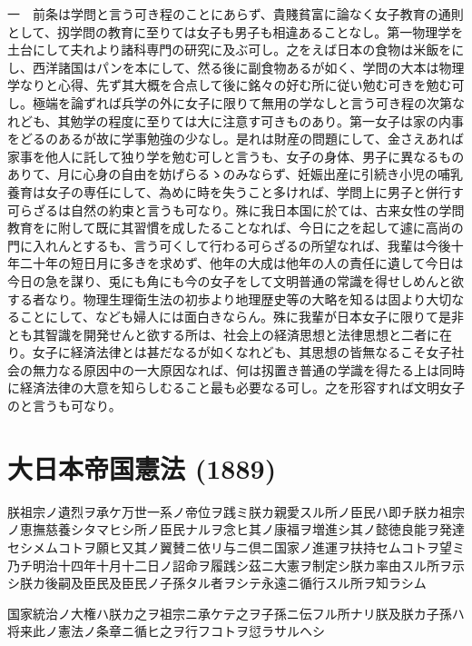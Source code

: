 \noindent{}一　前条は学問と言う可き程のことにあらず、貴賤貧富に論なく女子教育の通則として、扨学問の教育に至りては女子も男子も相違あることなし。第一物理学を土台にして夫れより諸科専門の研究に及ぶ可し。之をえば日本の食物は米飯をにし、西洋諸国はパンを本にして、然る後に副食物あるが如く、学問の大本は物理学なりと心得、先ず其大概を合点して後に銘々の好む所に従い勉む可きを勉む可し。極端を論ずれば兵学の外に女子に限りて無用の学なしと言う可き程の次第なれども、其勉学の程度に至りては大に注意す可きものあり。第一女子は家の内事をどるのあるが故に学事勉強の少なし。是れは財産の問題にして、金さえあれば家事を他人に託して独り学を勉む可しと言うも、女子の身体、男子に異なるものありて、月に心身の自由を妨げらるゝのみならず、妊娠出産に引続き小児の哺乳養育は女子の専任にして、為めに時を失うこと多ければ、学問上に男子と併行す可らざるは自然の約束と言うも可なり。殊に我日本国に於ては、古来女性の学問教育をに附して既に其習慣を成したることなれば、今日に之を起して遽に高尚の門に入れんとするも、言う可くして行わる可らざるの所望なれば、我輩は今後十年二十年の短日月に多きを求めず、他年の大成は他年の人の責任に遺して今日は今日の急を謀り、兎にも角にも今の女子をして文明普通の常識を得せしめんと欲する者なり。物理生理衛生法の初歩より地理歴史等の大略を知るは固より大切なることにして、なども婦人には面白きならん。殊に我輩が日本女子に限りて是非とも其智識を開発せんと欲する所は、社会上の経済思想と法律思想と二者に在り。女子に経済法律とは甚だなるが如くなれども、其思想の皆無なるこそ女子社会の無力なる原因中の一大原因なれば、何は扨置き普通の学識を得たる上は同時に経済法律の大意を知らしむること最も必要なる可し。之を形容すれば文明女子のと言うも可なり。




\section{大日本帝国憲法 (1889)}



朕祖宗ノ遺烈ヲ承ケ万世一系ノ帝位ヲ践ミ朕カ親愛スル所ノ臣民ハ即チ朕カ祖宗ノ恵撫慈養シタマヒシ所ノ臣民ナルヲ念ヒ其ノ康福ヲ増進シ其ノ懿徳良能ヲ発達セシメムコトヲ願ヒ又其ノ翼賛ニ依リ与ニ倶ニ国家ノ進運ヲ扶持セムコトヲ望ミ乃チ明治十四年十月十二日ノ詔命ヲ履践シ茲ニ大憲ヲ制定シ朕カ率由スル所ヲ示シ朕カ後嗣及臣民及臣民ノ子孫タル者ヲシテ永遠ニ循行スル所ヲ知ラシム

国家統治ノ大権ハ朕カ之ヲ祖宗ニ承ケテ之ヲ子孫ニ伝フル所ナリ朕及朕カ子孫ハ将来此ノ憲法ノ条章ニ循ヒ之ヲ行フコトヲ愆ラサルヘシ

